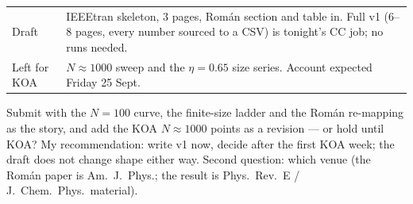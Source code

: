 \documentclass[11pt,a4paper]{article}
\begin{document}
\begin{center}
\begin{tabular}{@{}p{5.2cm}p{9.6cm}@{}}
Draft & IEEEtran skeleton, 3 pages, Rom\'an section and table in. Full v1 (6--8 pages, every number sourced to a CSV) is tonight's CC job; no runs needed. \\
Left for KOA & $N \approx 1000$ sweep and the $\eta = 0.65$ size series. Account expected Friday 25 Sept. \\
\bottomrule
\end{tabular}
\end{center}

\begin{ask}[Paper 1]
Submit with the $N = 100$ curve, the finite-size ladder and the Rom\'an re-mapping as the story, and add the KOA $N \approx 1000$ points as a revision --- or hold until KOA? My recommendation: write v1 now, decide after the first KOA week; the draft does not change shape either way. Second question: which venue (the Rom\'an paper is Am.\ J.\ Phys.; the result is Phys.\ Rev.\ E / J.\ Chem.\ Phys.\ material).
\end{ask}
\end{document}
